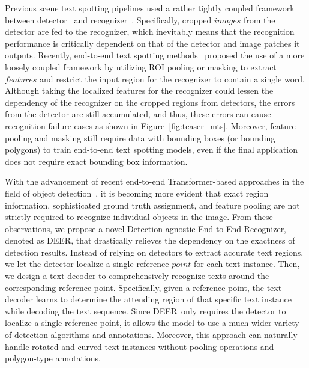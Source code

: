 \documentclass[10pt,twocolumn,letterpaper]{article}
\newcommand{\Figure}[1]{Figure~\ref{fig:#1}}
\newcommand{\methodname}[0]{DEER}
\begin{document}
Previous scene text spotting pipelines used a rather tightly coupled framework between detector~\cite{CUTE80,liao2018textboxes++,baek2019character,liao2020real} and recognizer~\cite{Jaderberg16mjsynth,shi2016robust,FAN,CRNN,AON,ASTER,ESIR}. Specifically, cropped $images$ from the detector are fed to the recognizer, which inevitably means that the recognition performance is critically dependent on that of the detector and image patches it outputs. 
Recently, end-to-end text spotting methods~\cite{liu2018fots,baek2020character,liao2020mask,liu2020abcnet} proposed the use of a more loosely coupled framework by utilizing ROI pooling or masking to extract $features$ and restrict the input region for the recognizer to contain a single word.
Although taking the localized features for the recognizer could lessen the dependency of the recognizer on the cropped regions from detectors, the errors from the detector are still accumulated, and thus, these errors can cause recognition failure cases as shown in \Figure{teaser_mts}. 
Moreover, feature pooling and masking still require data with bounding boxes (or bounding polygons) to train end-to-end text spotting models, even if the final application does not require exact bounding box information.


With the advancement of recent end-to-end Transformer-based approaches in the field of object detection~\cite{carion2020end,zhu2021deformable,yao2021efficient,chen2021pix2seq}, it is becoming more evident that exact region information, sophisticated ground truth assignment, and feature pooling are not strictly required to recognize individual objects in the image.
From these observations, we propose a novel Detection-agnostic End-to-End Recognizer, denoted as \methodname, that drastically relieves the dependency on the exactness of detection results. 
Instead of relying on detectors to extract accurate text regions, we let the detector localize a single reference $point$ for each text instance. Then, we design a text decoder to comprehensively recognize texts around the corresponding reference point. 
Specifically, given a reference point, the text decoder learns to determine the attending region of that specific text instance while decoding the text sequence.  
Since \methodname~only requires the detector to localize a single reference point, it allows the model to use a much wider variety of detection algorithms and annotations. Moreover, this approach can naturally handle rotated and curved text instances without pooling operations and polygon-type annotations.
\end{document}
